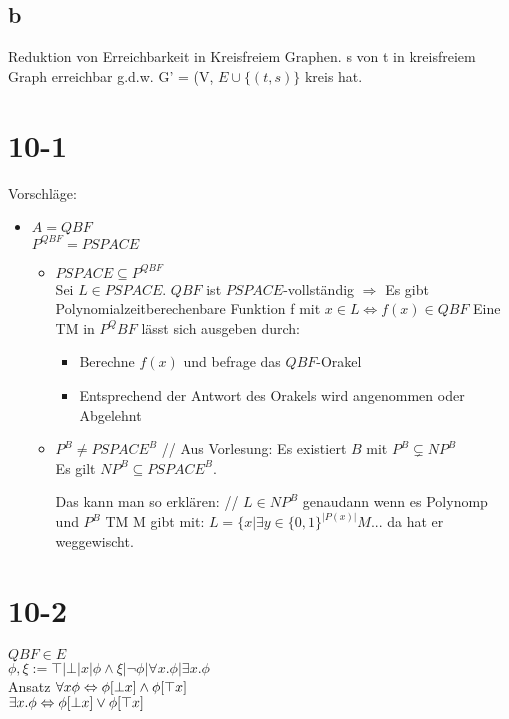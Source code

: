 \documentclass[12pt, oneside, a4paper, numbers=enddot, abstracton, parskip=full]{scrreprt}
\begin{document}
  \subsection{b}
  Reduktion von Erreichbarkeit in Kreisfreiem Graphen. s von t in kreisfreiem Graph erreichbar g.d.w. G' = (V, $E \cup \{(t, s)\}$ kreis hat.


\section{10-1}
Vorschläge:
\begin{itemize}
\item $A = QBF$ \\
  $P^{QBF} = PSPACE$
  \begin{itemize}
  \item $PSPACE \subseteq P^{QBF}$ \\ Sei $L \in PSPACE.$ $QBF$ ist
    $PSPACE$-vollständig $\Rightarrow$ Es gibt
    Polynomialzeitberechenbare Funktion f mit $x \in L \Leftrightarrow f(x) \in QBF$
    Eine TM in $P^QBF$ lässt sich ausgeben durch:
    \begin{itemize}
    \item Berechne $f(x)$ und befrage das $QBF$-Orakel
    \item Entsprechend der Antwort des Orakels wird angenommen oder Abgelehnt
    \end{itemize}
  \item $P^B \neq PSPACE^B$ //
    Aus Vorlesung: Es existiert $B$ mit $P^B \subsetneq NP^B$ \\
    Es gilt $NP^B \subseteq PSPACE^B$.

    Das kann man so erklären: //
    $L \in NP^B$ genaudann wenn es Polynomp  und $P^B$ TM M gibt mit:
    $L = \{x | \exists y \in \{ 0,1\}^{|P(x)|} M...$ da hat er weggewischt.
    
  \end{itemize}
\end{itemize}

\section{10-2}
$QBF \in E$ \\

$\phi, \xi := \top | \bot | x | \phi \land \xi | \neg \phi | \forall x . \phi | \exists x.\phi$ \\
Ansatz $ \forall x \phi \Leftrightarrow \phi [\bot \/ x ] \land \phi [ \top \/ x]$ \\
$ \exists x.\phi \Leftrightarrow \phi [\bot \/x ] \lor \phi [ \top \/ x ]$ \\
\end{document}
